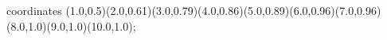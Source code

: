 					coordinates { (1.0,0.5)(2.0,0.61)(3.0,0.79)(4.0,0.86)(5.0,0.89)(6.0,0.96)(7.0,0.96)(8.0,1.0)(9.0,1.0)(10.0,1.0)};